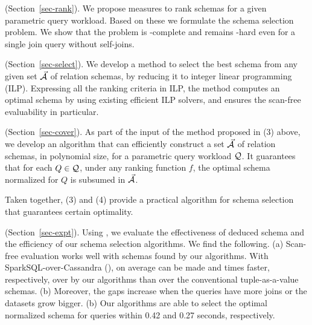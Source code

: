  (Section~\ref{sec-rank}).
We propose measures to rank \baav schemas for a
given parametric query workload. Based on these
we formulate the \baav schema selection problem.
We show that the problem is \NP-complete and remains \NP-hard
even for a single join query without self-joins.

 (Section~\ref{sec-select}).
We develop a method to select the best \baav  schema 
from any given set $\vec{{\mathcal A}}$ of \baav relation schemas, by reducing it to 
integer linear programming (ILP). Expressing all the ranking
criteria in ILP, the method computes an optimal \baav
schema by using existing efficient ILP solvers, and
ensures the scan-free evaluability in particular.

 (Section~\ref{sec-cover}).
As part of the input of the method proposed in (3) above,
we %
develop an algorithm that can efficiently construct a
set $\vec{{\mathcal A}}$ of \baav relation schemas, in polynomial
size, for a parametric query workload $\mathcal Q$.
It guarantees that for each $Q\in \mathcal Q$, under
any ranking function $f$, the optimal \baav schema
normalized for $Q$ is subsumed in $\vec{{\mathcal A}}$.

Taken together, (3) and (4) provide a practical
  algorithm for schema selection that guarantees certain optimality.
  

 (Section~\ref{sec-expt}). 
Using , we
evaluate the effectiveness
of deduced \baav schema %
and the efficiency of
our schema selection algorithms.
We find the following.
(a) Scan-free evaluation %
works well with \baav schemas found
by our algorithms. With SparkSQL-over-Cassandra (\soc),
on average  can be made \xx and \xx
times faster, respectively, over  by our algorithms than over the conventional
tuple-as-a-value schemas.
(b) 
Moreover, the gaps increase when the queries have more joins or the datasets grow bigger.
(b) Our algorithms are able to select
the optimal normalized \baav schema for 
queries within 0.42 and 0.27 seconds, respectively.


